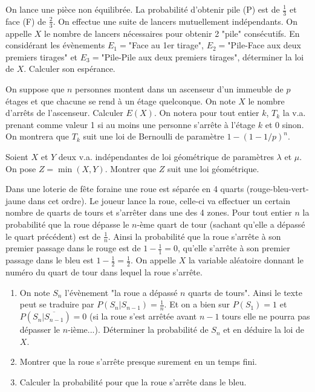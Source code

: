 \begin{exercice}
On lance une pièce non équilibrée. La probabilité d'obtenir pile (P) est de $\frac{1}{3}$ et face (F) de $\frac{2}{3}$. On effectue une suite de lancers mutuellement indépendants. On appelle $X$ le nombre de lancers nécessaires pour obtenir 2 "pile" consécutifs.
En considérant les évènements $E_{1}=$"Face au 1er tirage", $E_{2}=$"Pile-Face aux deux premiers tirages" et $E_{3}=$"Pile-Pile aux deux premiers tirages", déterminer la loi de $X$. Calculer son espérance.
\end{exercice}

\begin{exercice}
On suppose que $n$ personnes montent dans un ascenseur d'un immeuble de $p$ étages et que chacune se rend à un étage quelconque. On note $X$ le nombre d'arrêts de l'ascenseur. Calculer $E(X)$.
On notera pour tout entier $k$, $T_{k}$ la v.a. prenant comme valeur 1 si au moins une personne s'arrête à l'étage $k$ et 0 sinon. On montrera que $T_{k}$ suit une loi de Bernoulli de paramètre $1-(1-1/p)^{n}$.
\end{exercice}

\begin{exercice}
Soient $X$ et $Y$ deux v.a. indépendantes de loi géométrique de paramètres $\lambda$ et $\mu$. On pose $Z=\min(X,Y)$. Montrer que $Z$ suit une loi géométrique.
\end{exercice}

\begin{exercice}
Dans une loterie de fête foraine une roue est séparée en 4 quarts (rouge-bleu-vert-jaune dans cet ordre). Le joueur lance la roue, celle-ci va effectuer un certain nombre de quarts de tours et s'arrêter dans une des 4 zones.
Pour tout entier $n$ la probabilité que la roue dépasse le $n$-ème quart de tour (sachant qu'elle a dépassé le quart précédent) est de $\frac{1}{n}$.
Ainsi la probabilité que la roue s'arrête à son premier passage dans le rouge est de $1-\frac{1}{1}=0$, qu'elle s'arrête à son premier passage dans le bleu est $1-\frac{1}{2}=\frac{1}{2}$.
On appelle $X$ la variable aléatoire donnant le numéro du quart de tour dans lequel la roue s'arrête.
\begin{enumerate}
    \item On note $S_{n}$ l'évènement "la roue a dépassé $n$ quarts de tours".
    Ainsi le texte peut se traduire par $P(S_{n}|S_{n-1})=\frac{1}{n}$.
    Et on a bien sur $P(S_{1})=1$ et $P(S_{n}|\overline{S_{n-1}})=0$ (si la roue s'est arrêtée avant $n-1$ tours elle ne pourra pas dépasser le $n$-ième...).
    Déterminer la probabilité de $S_{n}$ et en déduire la loi de $X$.
    \item Montrer que la roue s'arrête presque surement en un temps fini.
    \item Calculer la probabilité pour que la roue s'arrête dans le bleu.
\end{enumerate}
\end{exercice}

